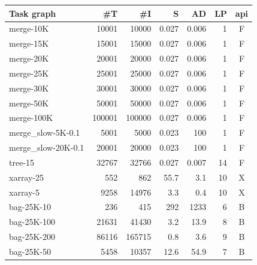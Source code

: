 \setlength{\tabcolsep}{5pt}
\begin{table}[h]
	\centering
	\begin{tabular}{l|rrrrrc}
		\toprule
		\textbf{Task graph} & \textbf{\#T} & \textbf{\#I}       & \textbf{S} &
		\textbf{AD}         & \textbf{LP}  & \textbf{\gls{api}}                               \\
		\midrule
		merge-10K           & \num{10001}        & \num{10000}              & 0.027      & 0.006 & 1  & F \\
		merge-15K           & \num{15001}        & \num{15000}              & 0.027      & 0.006 & 1  & F \\
		merge-20K           & \num{20001}        & \num{20000}              & 0.027      & 0.006 & 1  & F \\
		merge-25K           & \num{25001}        & \num{25000}              & 0.027      & 0.006 & 1  & F \\
		merge-30K           & \num{30001}        & \num{30000}              & 0.027      & 0.006 & 1  & F \\
		merge-50K           & \num{50001}        & \num{50000}              & 0.027      & 0.006 & 1  & F \\
		merge-100K          & \num{100001}       & \num{100000}             & 0.027      & 0.006 & 1  & F \\
		merge\_slow-5K-0.1  & \num{5001}         & \num{5000}               & 0.023      & 100   & 1  & F \\
		merge\_slow-20K-0.1 & \num{20001}        & \num{20000}              & 0.023      & 100   & 1  & F \\
		tree-15             & \num{32767}        & \num{32766}              & 0.027      & 0.007 & 14 & F \\
		xarray-25           & \num{552}          & \num{862}                & 55.7       & 3.1   & 10 & X \\
		xarray-5            & \num{9258}         & \num{14976}              & 3.3        & 0.4   & 10 & X \\
		bag-25K-10          & \num{236}          & \num{415}                & 292        & \num{1233}  & 6  & B \\
		bag-25K-100         & \num{21631}        & \num{41430}              & 3.2        & 13.9  & 8  & B \\
		bag-25K-200         & \num{86116}        & \num{165715}             & 0.8        & 3.6   & 9  & B \\
		bag-25K-50          & \num{5458}         & \num{10357}              & 12.6       & 54.9  & 7  & B \\

\end{tabular}
\end{table}
